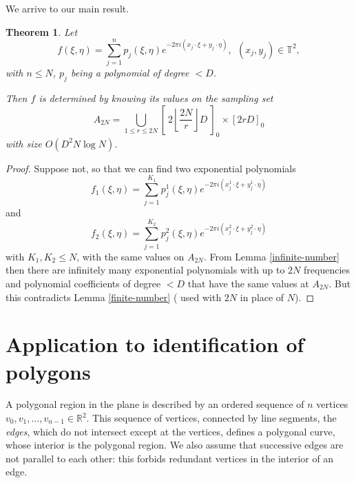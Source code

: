\documentclass[12pt,a4paper,oneside]{amsart}
\newtheorem{theorem}{Theorem}[section]
\theoremstyle{definition}
\newcommand{\Floor}[1]{{\left\lfloor{#1}\right\rfloor}}
\newcommand{\RR}{{\mathbb R}}
\newcommand{\TT}{{\mathbb T}}
\newcommand{\red}[1]{{#1}}
\newcounter{rem}
\begin{document}
We arrive to our main result.
\begin{theorem}\label{main}
Let
$$
f(\xi,\eta)= \sum_{j=1}^n p_j (\xi,\eta) e^{-2\pi i (x_j \cdot \xi + y_j \cdot \eta )},\red{\ \ (x_j, y_j) \in \TT^2,}
$$
with $n \le N$, $p_j $ being a polynomial of degree $< D$.

Then $f$ is determined by knowing its values on the sampling set
\begin{equation}\label{An-in-main}
A_{2N} = \bigcup_{1\le r\le 2N} \left[ \: 2\Floor{ \frac{2N}{r}} D \: \right]_0 \times [2rD]_0
\end{equation}
with size $O (D^2 N\log N)$.
\end{theorem}
\begin{proof}
Suppose not, so that we can find two exponential polynomials
\begin{equation*}
	f_1(\xi,\eta)= \sum_{j=1}^{K_1} p_j ^1 (\xi,\eta) e^{-2\pi i (x_j ^1 \cdot \xi + y_j ^1 \cdot \eta )}
\end{equation*}
and
\begin{equation*}
	f_2(\xi,\eta)= \sum_{j=1}^{K_2} p_j ^2 (\xi,\eta) e^{-2\pi i (x_j ^2 \cdot \xi + y_j ^2 \cdot \eta )}
\end{equation*}
with $K_1,K_2 \le N$, with the same values on $A_{2N}$. From Lemma \ref{infinite-number} then there are infinitely many exponential polynomials with up to $2N$ frequencies  and polynomial coefficients of degree $< D$ that have the same values at $A_{2N}$. But this contradicts Lemma \ref{finite-number} ( used with $2N$ in place of $N$).

\end{proof}


\section{Application to identification of polygons}\label{s:polygons}

A polygonal region in the plane is described by an ordered sequence of $n$ vertices $v_0, v_1, \ldots, v_{n-1} \in \RR^2$. This sequence of vertices, connected by line segments, the \textit{edges}, which do not intersect except at the vertices, defines a polygonal curve, whose interior is the polygonal region. We also assume that successive edges are not parallel to each other: this forbids redundant vertices in the interior of an edge.
\end{document}
